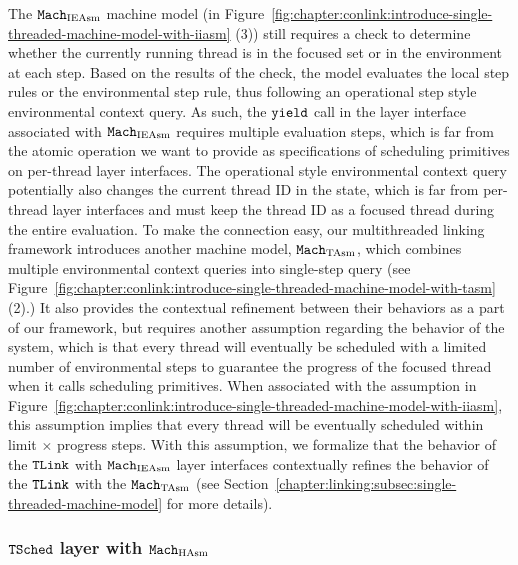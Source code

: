 The ${\mathrm{\texttt{Mach}}}_{\mathrm{IEAsm}}$ machine model  (in Figure~\ref{fig:chapter:conlink:introduce-single-threaded-machine-model-with-iiasm}  (3)) 
still requires a check to determine whether the currently running thread is in the focused set or in the environment at each step. 
Based on the results of the check, the model evaluates the local step rules or the environmental step rule, 
thus following an operational step style environmental context query. 
As such, the ${\mathrm{\texttt{yield}}}$ call in the layer interface associated with
 ${\mathrm{\texttt{Mach}}}_{\mathrm{IEAsm}}$ 
requires multiple evaluation steps, which is far from the atomic operation we want to provide as specifications of scheduling primitives on per-thread layer interfaces. 
The operational style environmental context query potentially also changes the current thread ID in the state, 
which is far from  per-thread layer interfaces and must keep the thread ID as a focused thread during the entire evaluation. 
To make the connection easy, our multithreaded linking framework introduces another machine model, ${\mathrm{\texttt{Mach}}}_{\mathrm{TAsm}}$, which combines multiple environmental context queries into single-step query (see Figure~\ref{fig:chapter:conlink:introduce-single-threaded-machine-model-with-tasm} (2).) 
It also provides the contextual refinement between their behaviors as a part of our framework, 
but requires another assumption regarding the behavior of the system, which is that every thread will eventually be scheduled with a limited number of environmental steps to guarantee the progress of the focused thread when it calls scheduling primitives. 
When associated with the assumption in Figure~\ref{fig:chapter:conlink:introduce-single-threaded-machine-model-with-iiasm},
 this assumption implies that every thread will be eventually scheduled within limit $\times$ progress steps. With this assumption, we formalize that the behavior of the ${{\mathrm{\texttt{TLink}}}}$ with  ${\mathrm{\texttt{Mach}}}_{\mathrm{IEAsm}}$ layer interfaces contextually refines the behavior of the ${{\mathrm{\texttt{TLink}}}}$  with the ${\mathrm{\texttt{Mach}}}_{\mathrm{TAsm}}$ 
 (see Section~\ref{chapter:linking:subsec:single-threaded-machine-model}  for more details).
 
 

\subsubsection{${{\mathrm{\texttt{TSched}}}}$ layer with ${\mathrm{\texttt{Mach}}}_{\mathrm{HAsm}}$} 



